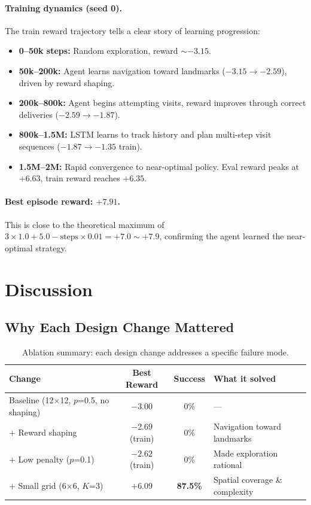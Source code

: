 \documentclass[11pt,a4paper]{article}
\begin{document}
\paragraph{Training dynamics (seed 0).}
The train reward trajectory tells a clear story of learning progression:
\begin{itemize}[nosep]
  \item \textbf{0--50k steps:} Random exploration, reward $\sim -3.15$.
  \item \textbf{50k--200k:} Agent learns navigation toward landmarks
        ($-3.15 \to -2.59$), driven by reward shaping.
  \item \textbf{200k--800k:} Agent begins attempting visits, reward improves
        through correct deliveries ($-2.59 \to -1.87$).
  \item \textbf{800k--1.5M:} LSTM learns to track history and plan
        multi-step visit sequences ($-1.87 \to -1.35$ train).
  \item \textbf{1.5M--2M:} Rapid convergence to near-optimal policy.
        Eval reward peaks at $+6.63$, train reward reaches $+6.35$.
\end{itemize}

\paragraph{Best episode reward: $+7.91$.} This is close to the theoretical
maximum of $3 \times 1.0 + 5.0 - \text{steps} \times 0.01 = +7.0 \sim +7.9$,
confirming the agent learned the near-optimal strategy.

\section{Discussion}

\subsection{Why Each Design Change Mattered}

\begin{table}[H]
\centering
\begin{tabular}{lccl}
\toprule
\textbf{Change} & \textbf{Best Reward} & \textbf{Success} & \textbf{What it solved} \\
\midrule
Baseline (12$\times$12, $p$=0.5, no shaping) & $-3.00$ & 0\% & --- \\
$+$ Reward shaping             & $-2.69$ (train) & 0\% & Navigation toward landmarks \\
$+$ Low penalty ($p$=0.1)      & $-2.62$ (train) & 0\% & Made exploration rational \\
$+$ Small grid (6$\times$6, $K$=3) & $+6.09$ & \textbf{87.5\%} & Spatial coverage \& complexity \\
\bottomrule
\end{tabular}
\caption{Ablation summary: each design change addresses a specific failure mode.}
\label{tab:ablation}
\end{table}
\end{document}
